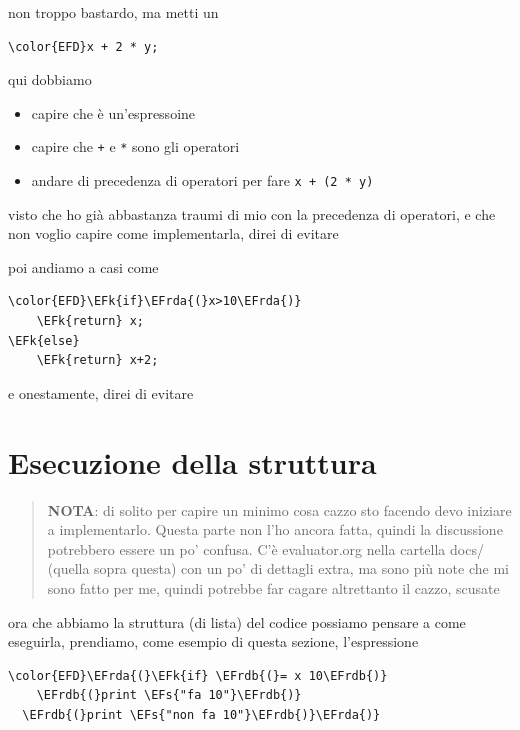 \documentclass[11pt]{article}
\newcommand{\EFs}[1]{\textcolor{EFs}{#1}} %
\newcommand{\EFk}[1]{\textcolor{EFk}{#1}} %
\newcommand{\EFrda}[1]{\textcolor{EFrda}{#1}} %
\newcommand{\EFrdb}[1]{\textcolor{EFrdb}{#1}} %
\begin{document}
non troppo bastardo, ma metti un
\begin{Code}
\begin{Verbatim}
\color{EFD}x + 2 * y;
\end{Verbatim}
\end{Code}
qui dobbiamo
\begin{itemize}
\item capire che è un'espressoine
\item capire che \texttt{+} e \texttt{*} sono gli operatori
\item andare di precedenza di operatori per fare \texttt{x + (2 * y)}
\end{itemize}

visto che ho già abbastanza traumi di mio con la precedenza di operatori, e che non voglio capire come implementarla, direi di evitare

poi andiamo a casi come
\begin{Code}
\begin{Verbatim}
\color{EFD}\EFk{if}\EFrda{(}x>10\EFrda{)}
    \EFk{return} x;
\EFk{else}
    \EFk{return} x+2;
\end{Verbatim}
\end{Code}

e onestamente, direi di evitare

\section{Esecuzione della struttura}
\label{sec:org9085583}
\begin{quote}
\textbf{NOTA}: di solito per capire un minimo cosa cazzo sto facendo devo iniziare a implementarlo.
Questa parte non l'ho ancora fatta, quindi la discussione potrebbero essere un po' confusa.
C'è evaluator.org nella cartella docs/ (quella sopra questa) con un po' di dettagli extra, ma sono più note che mi sono fatto per me, quindi potrebbe far cagare altrettanto il cazzo, scusate
\end{quote}

ora che abbiamo la struttura (di lista) del codice possiamo pensare a come eseguirla, prendiamo, come esempio di questa sezione, l'espressione
\begin{Code}
\begin{Verbatim}
\color{EFD}\EFrda{(}\EFk{if} \EFrdb{(}= x 10\EFrdb{)}
    \EFrdb{(}print \EFs{"fa 10"}\EFrdb{)}
  \EFrdb{(}print \EFs{"non fa 10"}\EFrdb{)}\EFrda{)}
\end{Verbatim}
\end{Code}
\end{document}
